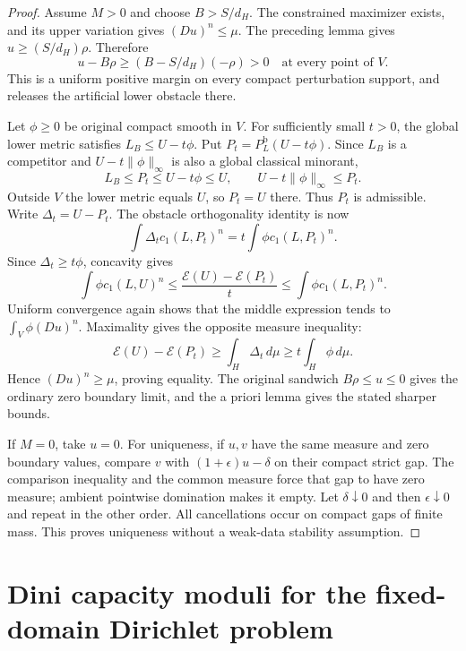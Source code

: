 \documentclass[11pt,a4paper]{article}
\numberwithin{equation}{section}
\theoremstyle{definition}
\theoremstyle{remark}
\begin{document}
\begin{proof}
Assume $M>0$ and choose $B>S/d_H$. The constrained maximizer
exists, and its upper variation gives $(Du)^n\leq\mu$.
The preceding lemma gives $u\geq(S/d_H)\rho$. Therefore
\[
 u-B\rho\geq(B-S/d_H)(-\rho)>0
 \quad\text{at every point of }V.
\]
This is a uniform positive margin on every compact perturbation
support, and releases the artificial lower obstacle there.

Let $\phi\geq0$ be original compact smooth in $V$. For sufficiently
small $t>0$, the global lower metric satisfies
$L_B\leq U-t\phi$. Put $P_t=P_L^{\mathrm b}(U-t\phi)$.
Since $L_B$ is a competitor and $U-t\|\phi\|_\infty$ is also
a global classical minorant,
\[
 L_B\leq P_t\leq U-t\phi\leq U,
 \qquad U-t\|\phi\|_\infty\leq P_t.
\]
Outside $V$ the lower metric equals $U$, so $P_t=U$ there.
Thus $P_t$ is admissible. Write $\Delta_t=U-P_t$.
The obstacle orthogonality identity is now
\[
 \int\Delta_t c_1(L,P_t)^n
       =t\int\phi c_1(L,P_t)^n.
\]
Since $\Delta_t\geq t\phi$, concavity gives
\[
 \int\phi c_1(L,U)^n
 \leq\frac{\mathcal E(U)-\mathcal E(P_t)}t
 \leq\int\phi c_1(L,P_t)^n.
\]
Uniform convergence again shows that the middle expression tends
to $\int_V\phi(Du)^n$. Maximality gives the opposite measure
inequality:
\[
 \mathcal E(U)-\mathcal E(P_t)
       \geq\int_H\Delta_t\,d\mu
       \geq t\int_H\phi\,d\mu.
\]
Hence $(Du)^n\geq\mu$, proving equality. The original sandwich
$B\rho\leq u\leq0$ gives the ordinary zero boundary limit,
and the a priori lemma gives the stated sharper bounds.

If $M=0$, take $u=0$. For uniqueness, if $u,v$ have the same
measure and zero boundary values, compare $v$ with
$(1+\epsilon)u-\delta$ on their compact strict gap. The
comparison inequality and the common measure force that gap to
have zero measure; ambient pointwise domination makes it empty.
Let $\delta\downarrow0$ and then $\epsilon\downarrow0$ and
repeat in the other order. All cancellations occur on compact
gaps of finite mass. This proves uniqueness without a weak-data
stability assumption.
\end{proof}



\section{Dini capacity moduli for the fixed-domain Dirichlet problem}
\label{sec:r3-dini-capacity-dirichlet}
\end{document}

